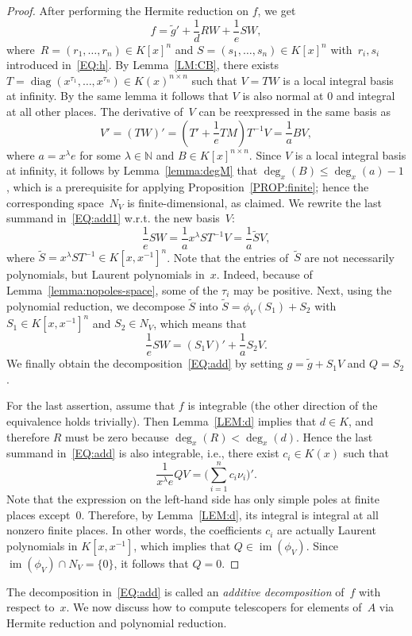 \documentclass[final,1p,times,authoryear]{elsarticle}
\newcommand{\bN}{ {\mathbb N}}
\def\im{\operatorname{im}}
\def\diag{\operatorname{diag}}
\begin{document}
\begin{proof}
After performing the Hermite reduction on $f$, we get
\begin{equation}\label{EQ:add1}
  f = \tilde{g}' + \frac{1}{d} RW + \frac{1}{e} SW,
\end{equation}
where~$R = (r_1, \ldots, r_n)\in K[x]^n$ and $S = (s_1, \ldots, s_n)\in K[x]^n$
with~$r_i, s_i$ introduced in~\eqref{EQ:h}. By Lemma~\ref{LM:CB}, there exists
$T = \diag(x^{\tau_1}, \ldots, x^{\tau_n}) \in K(x)^{n\times n}$ such that $V = TW$
is a local integral basis at infinity. By the same lemma it follows
that $V$ is also normal at $0$ and integral at all other places.
The derivative of~$V$ can be reexpressed in the same basis as
\[
  V' = (TW)' = \left(T' + \frac{1}{e}TM\right)T^{-1}V = \frac{1}{a}BV,
\]
where $a=x^\lambda e$ for some $\lambda\in \bN$ and $B\in K[x]^{n\times n}$.
Since $V$ is a local integral basis at infinity, it follows by
Lemma~\ref{lemma:degM} that $\deg_x(B) \leq \deg_x(a)-1$, which is a
prerequisite for applying Proposition~\ref{PROP:finite}; hence the
corresponding space~$N_V$ is finite-dimensional, as claimed.
We rewrite the last summand in~\eqref{EQ:add1} w.r.t. the new basis~$V$:
\[
  \frac{1}{e} SW = \frac{1}{a} x^\lambda ST^{-1}V= \frac{1}{a} \tilde{S}V,
\]
where $\tilde{S} = x^\lambda S T^{-1} \in K[x,x^{-1}]^n$. Note that the entries
of~$\tilde{S}$ are not necessarily polynomials, but Laurent polynomials in~$x$.
Indeed, because of Lemma~\ref{lemma:nopoles-space}, some of the $\tau_i$
may be positive. Next, using the polynomial reduction, we decompose
$\tilde{S}$ into $\tilde{S} = \phi_{V}(S_1) + S_2$ with
$S_1\in K[x,x^{-1}]^n$ and $S_2\in N_V$, which means that
\[
  \frac{1}{e} SW = (S_1 V)' + \frac{1}{a} S_2 V.
\]
We finally obtain the decomposition~\eqref{EQ:add} by setting
$g = \tilde{g} + S_1 V$ and $Q = S_2$.

For the last assertion, assume that $f$ is integrable (the other direction of
the equivalence holds trivially). Then Lemma~\ref{LEM:d} implies that $d\in K$,
and therefore $R$ must be zero because $\deg_x(R) < \deg_x(d)$. Hence the last
summand in~\eqref{EQ:add} is also integrable, i.e., there exist $c_i\in K(x)$
such that
\[
  \frac{1}{x^\lambda e} QV = \biggl(\sum_{i=1}^n c_i \nu_i\biggr)'.
\]
Note that the expression on the left-hand side has only simple poles at finite
places except~$0$. Therefore, by Lemma~\ref{LEM:d}, its integral is integral
at all nonzero finite places. In other words, the coefficients $c_i$ are actually
Laurent polynomials in $K[x,x^{-1}]$, which implies that $Q \in \im(\phi_V)$.
Since $\im(\phi_V) \cap N_V = \{0\}$, it follows that $Q=0$.
\end{proof}
The decomposition in~\eqref{EQ:add} is called an \emph{additive decomposition} of~$f$ with respect to~$x$.
We now discuss how to compute telescopers for elements of~$A$ via Hermite reduction and
polynomial reduction.
\end{document}
